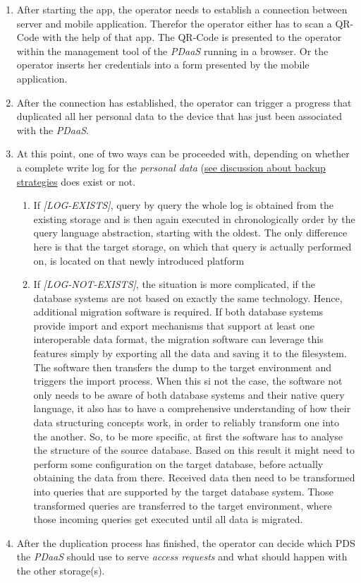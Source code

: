 \documentclass[12pt,english,a4paper,titlepage,cleardoublepage=empty,dottedtoc]{report}
\providecommand{\tightlist}{%
  \setlength{\itemsep}{0pt}\setlength{\parskip}{0pt}}
\begin{document}
\begin{enumerate}
\def\labelenumi{\arabic{enumi}.}
\item
  After starting the app, the operator needs to establish a connection
  between server and mobile application. Therefor the operator either
  has to scan a QR-Code with the help of that app. The QR-Code is
  presented to the operator within the management tool of the
  \emph{PDaaS} running in a browser. Or the operator inserts her
  credentials into a form presented by the mobile application.
\item
  After the connection has established, the operator can trigger a
  progress that duplicated all her personal data to the device that has
  just been associated with the \emph{PDaaS}.
\item
  At this point, one of two ways can be proceeded with, depending on
  whether a complete write log for the \emph{personal data}
  (\protect\hyperlink{data}{see discussion about backup strategies} does
  exist or not.

  \begin{enumerate}
  \def\labelenumii{\alph{enumii})}
  \tightlist
  \item
    If \emph{{[}LOG-EXISTS{]}}, query by query the whole log is obtained
    from the existing storage and is then again executed in
    chronologically order by the query language abstraction, starting
    with the oldest. The only difference here is that the target
    storage, on which that query is actually performed on, is located on
    that newly introduced platform
  \item
    If \emph{{[}LOG-NOT-EXISTS{]}}, the situation is more complicated,
    if the database systems are not based on exactly the same
    technology. Hence, additional migration software is required. If
    both database systems provide import and export mechanisms that
    support at least one interoperable data format, the migration
    software can leverage this features simply by exporting all the data
    and saving it to the filesystem. The software then transfers the
    dump to the target environment and triggers the import process. When
    this si not the case, the software not only needs to be aware of
    both database systems and their native query language, it also has
    to have a comprehensive understanding of how their data structuring
    concepts work, in order to reliably transform one into the another.
    So, to be more specific, at first the software has to analyse the
    structure of the source database. Based on this result it might need
    to perform some configuration on the target database, before
    actually obtaining the data from there. Received data then need to
    be transformed into queries that are supported by the target
    database system. Those transformed queries are transferred to the
    target environment, where those incoming queries get executed until
    all data is migrated.
  \end{enumerate}
\item
  After the duplication process has finished, the operator can decide
  which PDS the \emph{PDaaS} should use to serve \emph{access requests}
  and what should happen with the other storage(s).
\end{enumerate}
\end{document}
